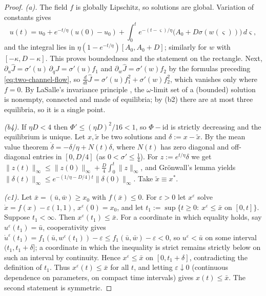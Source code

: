 \begin{proof}
\emph{(a).} The field $f$ is globally Lipschitz, so solutions are global.
Variation of constants gives
\[
u(t)=u_0+e^{-t/\eta}(u(0)-u_0)+\int_0^te^{-(t-\varsigma)/\eta}\bigl(A_0+D\sigma(w(\varsigma))\bigr)\,d\varsigma ,
\]
and the integral lies in $\eta(1-e^{-t/\eta})[A_0,A_0+D]$; similarly for
$w$ with $[-\kappa,D-\kappa]$. This proves boundedness and the statement
on the rectangle. Next, $\partial_u\hat J=\sigma'(u)\,\partial_qJ=\sigma'(u)f_1$
and $\partial_w\hat J=\sigma'(w)f_2$ by the formulas preceding
\eqref{eq:two-channel-flow}, so
$\frac{d}{dt}\hat J=\sigma'(u)f_1^2+\sigma'(w)f_2^2$, which vanishes only
where $f=0$. By LaSalle's invariance principle
\cite{lasalle1976stability}, the $\omega$-limit set of a (bounded) solution
is nonempty, connected and made of equilibria; by (b2) there are at most
three equilibria, so it is a single point.

\emph{(b4).} If $\eta D<4$ then $\Phi'\le(\eta D)^2/16<1$, so
$\Phi-\mathrm{id}$ is strictly decreasing and the equilibrium is unique.
Let $x,\tilde x$ be two solutions and $\delta:=x-\tilde x$. By the mean
value theorem $\dot\delta=-\delta/\eta+N(t)\delta$, where $N(t)$ has zero
diagonal and off-diagonal entries in $[0,D/4]$ (as $0<\sigma'\le\frac14$).
For $z:=e^{t/\eta}\delta$ we get
$\|z(t)\|_\infty\le\|z(0)\|_\infty+\frac D4\int_0^t\|z\|_\infty$, and
Gr\"onwall's lemma yields
$\|\delta(t)\|_\infty\le e^{-(1/\eta-D/4)t}\|\delta(0)\|_\infty$. Take
$\tilde x\equiv x^\ast$.

\emph{(c1).} Let $\bar x=(\bar u,\bar w)\ge x_0$ with $f(\bar x)\le0$. For
$\varepsilon>0$ let $x^\varepsilon$ solve
$\dot x=f(x)-\varepsilon(1,1)$, $x^\varepsilon(0)=x_0$, and let
$t_1:=\sup\{t\ge0:\ x^\varepsilon\le\bar x\text{ on }[0,t]\}$. Suppose
$t_1<\infty$. Then $x^\varepsilon(t_1)\le\bar x$. For a coordinate in which
equality holds, say $u^\varepsilon(t_1)=\bar u$, cooperativity gives
$\dot u^\varepsilon(t_1)=f_1(\bar u,w^\varepsilon(t_1))-\varepsilon\le f_1(\bar u,\bar w)-\varepsilon<0$,
so $u^\varepsilon<\bar u$ on some interval $(t_1,t_1+\delta]$; a coordinate
in which the inequality is strict remains strictly below on such an
interval by continuity. Hence $x^\varepsilon\le\bar x$ on
$[0,t_1+\delta]$, contradicting the definition of $t_1$. Thus
$x^\varepsilon(t)\le\bar x$ for all $t$, and letting $\varepsilon\downarrow0$
(continuous dependence on parameters, on compact time intervals) gives
$x(t)\le\bar x$. The second statement is symmetric.


\end{proof}
